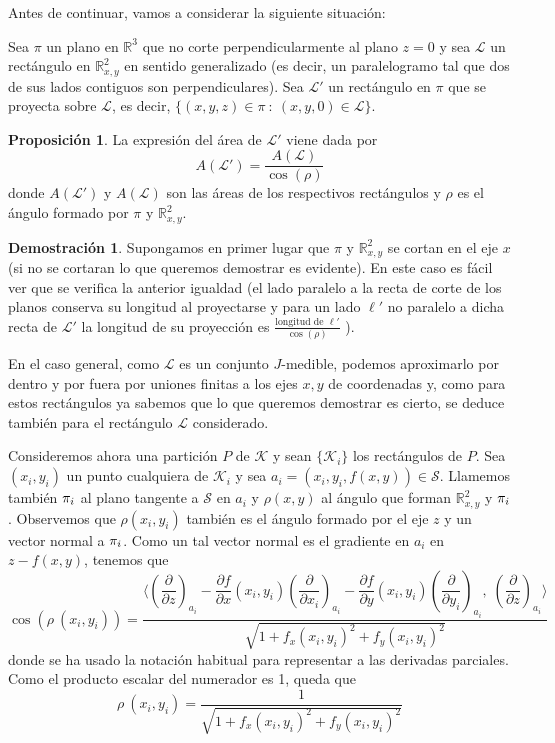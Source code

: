 \documentclass[12pt,twoside]{report}
\newcommand\mc[1]{\mathcal{#1}}
\theoremstyle{azul}
\theoremstyle{azul2}
\theoremstyle{plain}
\theoremstyle{definition}
\newtheorem*{prop}{Proposición}
\newtheorem*{dem}{Demostración}
\theoremstyle{remark}
\begin{document}
Antes de continuar, vamos a considerar la siguiente situación:

Sea $\pi$ un plano en $\mathbb{R}^3$ que no corte perpendicularmente al plano $z=0$ y sea $\mc{L}$ un rectángulo en  $\mathbb{R}_{x,y}^2$ en sentido generalizado (es decir, un paralelogramo tal que dos de sus lados contiguos son perpendiculares). Sea $\mc{L}'$ un rectángulo en $\pi$ que se proyecta sobre $\mc{L}$, es decir, $\{(x,y,z) \in \pi \: : \: (x,y,0) \in \mc{L} \}$. 
\begin{prop}
La expresión del área de $\mc{L}'$ viene dada por
$$A(\mc{L}') = \dfrac{A(\mc{L})}{\cos (\rho)}$$
donde $A(\mc{L}')$ y $A(\mc{L})$ son las áreas de los respectivos rectángulos y $\rho$ es el ángulo formado por $\pi$ y $\mathbb{R}_{x,y}^2$.
\end{prop}
\begin{dem}
Supongamos en primer lugar que $\pi$ y $\mathbb{R}_{x,y}^2$ se cortan en el eje $x$ (si no se cortaran lo que queremos demostrar es evidente). En este caso es fácil ver que se verifica la anterior igualdad (el lado paralelo a la recta de corte de los planos conserva su longitud al proyectarse y para un lado $\ell '$ no paralelo a dicha recta de $\mc{L}'$ la longitud de su proyección es $\frac{\text{longitud de } \ell'}{\cos(\rho)}$ \Big).

En el caso general, como $\mc{L}$ es un conjunto $J$-medible, podemos aproximarlo por dentro y por fuera por uniones finitas a los ejes $x,y$ de coordenadas y, como para estos rectángulos ya sabemos que lo que queremos demostrar es cierto, se deduce también para el rectángulo $\mc{L}$ considerado.

Consideremos ahora una partición $P$ de $\mc{K}$ y sean $\{\mc{K}_i\}$ los rectángulos de $P$. Sea $(x_i, y_i)$ un punto cualquiera de $\mc{K}_i$ y sea $a_i=(x_i, y_i, f(x,y)) \in \mc{S}$. Llamemos también $\mathlarger{\pi}_i$ al plano tangente a $\mc{S}$ en $a_i$ y $\rho(x,y)$ al ángulo que forman $\mathbb{R}^2_{x,y}$ y $\mathlarger{\pi}_i$. Observemos que $\rho(x_i,y_i)$ también es el ángulo formado por el eje $z$ y un vector normal a $\mathlarger{\pi}_i$. Como un tal vector normal es el gradiente en $a_i$ en $z-f(x,y)$, tenemos que 
$$\cos(\rho \: (x_i,y_i))=\dfrac{\langle \left(\dfrac{\partial}{\partial z}\right)_{a_i} - \dfrac{\partial f}{\partial x}(x_i,y_i) \left(\dfrac{\partial}{\partial x_i}\right)_{a_i} - \dfrac{\partial f}{\partial y}(x_i,y_i) \left(\dfrac{\partial}{\partial y_i}\right)_{a_i} ,\; \left(\dfrac{\partial}{\partial z}\right)_{a_i} \rangle}{\sqrt{1 + f_x(x_i, y_i)^2 + f_y(x_i, y_i)^2} }$$
donde se ha usado la notación habitual para representar a las derivadas parciales. Como el producto escalar del numerador es 1, queda que 
$$\rho \: (x_i, y_i) = \dfrac{1}{\sqrt{1 + f_x(x_i, y_i)^2 + f_y(x_i, y_i)^2} }$$


\end{dem}
\end{document}
